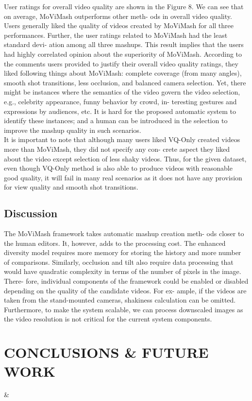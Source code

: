 \documentclass{sig-alternate}
\providecommand{\DIFadd}[1]{{\protect\color{blue}\uwave{#1}}} %
\providecommand{\DIFaddbegin}{} %
\begin{document}
User ratings for overall video quality are shown in the Figure 8.
We can see that on average, MoViMash outperforms other meth-
ods in overall video quality. Users generally liked the quality of
videos created by MoViMash for all three performances. Further,
the user ratings related to MoViMash had the least standard devi-
ation among all three mashups. This result implies that the users
had highly correlated opinion about the superiority of MoViMash.
According to the comments users provided to justify their overall
video quality ratings, they liked following things about MoViMash:
complete coverage (from many angles), smooth shot transitions,
less occlusion, and balanced camera selection. Yet, there might
be instances where the semantics of the video govern the video
selection, e.g., celebrity appearance, funny behavior by crowd, in-
teresting gestures and expressions by audiences, etc. It is hard for
the proposed automatic system to identify these instances; and a
human can be introduced in the selection to improve the mashup
quality in such scenarios.\\
It is important to note that although many users liked VQ-Only
created videos more than MoViMash, they did not specify any con-
crete aspect they liked about the video except selection of less
shaky videos. Thus, for the given dataset, even though VQ-Only
method is also able to produce videos with reasonable good quality,
it will fail in many real scenarios as it does not have any provision
for view quality and smooth shot transitions.

\subsection{Discussion}
The MoViMash framework takes automatic mashup creation meth-
ods closer to the human editors. It, however, adds to the processing
cost. The enhanced diversity model requires more memory for storing the history and more number of comparisons. Similarly, occlusion and tilt also require data processing that would have quadratic
complexity in terms of the number of pixels in the image. There-
fore, individual components of the framework could be enabled or
disabled depending on the quality of the candidate videos. For ex-
ample, if the videos are taken from the stand-mounted cameras,
shakiness calculation can be omitted. Furthermore, to make the
system scalable, we can process downscaled images as the video
resolution is not critical for the current system components.

\section{CONCLUSIONS & FUTURE WORK}
\DIFaddbegin \DIFadd{its CONCLUSIONS }& \DIFadd{FUTURE WORK }\\
\end{document}
